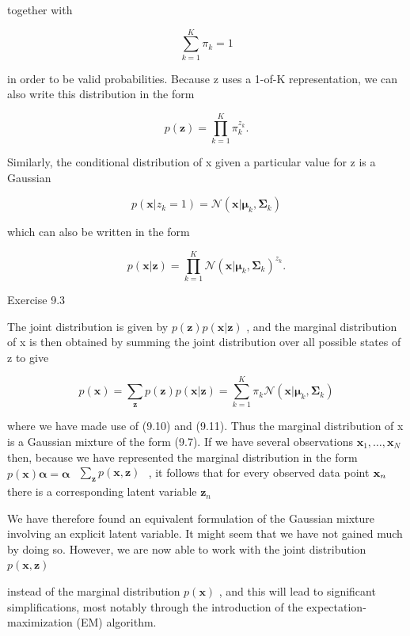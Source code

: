 \documentclass[
  10
]{article}
\begin{document}
together with

\[
\sum_ {k = 1} ^ {K} \pi_ {k} = 1\tag{9.9}
\]

in order to be valid probabilities. Because z uses a 1-of-K
representation, we can also write this distribution in the form

\[
p (\mathbf {z}) = \prod_ {k = 1} ^ {K} \pi_ {k} ^ {z _ {k}}.\tag{9.10}
\]

Similarly, the conditional distribution of x given a particular value
for z is a Gaussian

\[
p (\mathbf {x} | z _ {k} = 1) = \mathcal {N} (\mathbf {x} | \pmb {\mu} _ {k}, \pmb {\Sigma} _ {k})
\]

which can also be written in the form

\[
p (\mathbf {x} | \mathbf {z}) = \prod_ {k = 1} ^ {K} \mathcal {N} (\mathbf {x} | \boldsymbol {\mu} _ {k}, \boldsymbol {\Sigma} _ {k}) ^ {z _ {k}}.\tag{9.11}
\]

Exercise 9.3

The joint distribution is given by
\(p ( \mathbf { z } ) p ( \mathbf { x } | \mathbf { z } )\) , and the
marginal distribution of x is then obtained by summing the joint
distribution over all possible states of z to give

\[
p (\mathbf {x}) = \sum_ {\mathbf {z}} p (\mathbf {z}) p (\mathbf {x} | \mathbf {z}) = \sum_ {k = 1} ^ {K} \pi_ {k} \mathcal {N} (\mathbf {x} | \boldsymbol {\mu} _ {k}, \boldsymbol {\Sigma} _ {k})\tag{9.12}
\]

where we have made use of (9.10) and (9.11). Thus the marginal
distribution of x is a Gaussian mixture of the form (9.7). If we have
several observations
\(\mathbf { x } _ { 1 } , \ldots , \mathbf { x } _ { N }\) then, because
we have represented the marginal distribution in the form
\(p ( \mathbf { x } ) \mathbf { \alpha } = \mathbf { \alpha }\)
\(\begin{array} { r } { \sum _ { \mathbf { z } } p ( \mathbf { x } , \mathbf { z } ) } \end{array}\)
, it follows that for every observed data point \({ \bf x } _ { n }\)
there is a corresponding latent variable \(\mathbf { z } _ { n }\)

We have therefore found an equivalent formulation of the Gaussian
mixture involving an explicit latent variable. It might seem that we
have not gained much by doing so. However, we are now able to work with
the joint distribution \(p ( \mathbf { x } , \mathbf { z } )\)

instead of the marginal distribution \(p ( \mathbf { x } )\) , and this
will lead to significant simplifications, most notably through the
introduction of the expectation-maximization (EM) algorithm.
\end{document}

